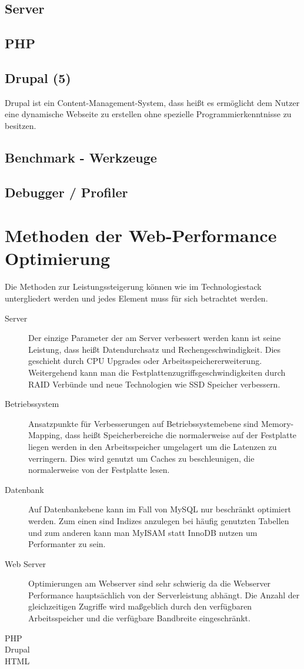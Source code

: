 \subsection{Server}
\subsection{PHP}
\subsection{Drupal (5)}
Drupal ist ein Content-Management-System, dass heißt es ermöglicht dem Nutzer eine dynamische Webseite zu erstellen ohne spezielle Programmierkenntnisse zu besitzen. 
\subsection{Benchmark - Werkzeuge}
\subsection{Debugger / Profiler}
\section{Methoden der Web-Performance Optimierung}
Die Methoden zur Leistungssteigerung können wie im Technologiestack untergliedert werden und jedes Element muss für sich betrachtet werden.

\begin{description}
  \item[Server] Der einzige Parameter der am Server verbessert werden kann ist seine Leistung, dass heißt Datendurchsatz und Rechengeschwindigkeit. Dies geschieht durch CPU Upgrades oder Arbeitsspeichererweiterung. Weitergehend kann man die Festplattenzugriffsgeschwindigkeiten durch RAID Verbünde und neue Technologien wie SSD Speicher verbessern. 
  \item[Betriebssystem] Ansatzpunkte für Verbesserungen auf Betriebssystemebene sind Memory-Mapping, dass heißt Speicherbereiche die normalerweise auf der Festplatte liegen werden in den Arbeitsspeicher umgelagert um die Latenzen zu verringern. Dies wird genutzt um Caches zu beschleunigen, die normalerweise von der Festplatte lesen.
  \item[Datenbank] Auf Datenbankebene kann im Fall von MySQL nur beschränkt optimiert werden. Zum einen sind Indizes anzulegen bei häufig genutzten Tabellen und zum anderen kann man MyISAM statt InnoDB nutzen um Performanter zu sein.
  \item[Web Server] Optimierungen am Webserver sind sehr schwierig da die Webserver Performance hauptsächlich von der Serverleistung abhängt. Die Anzahl der gleichzeitigen Zugriffe wird maßgeblich durch den verfügbaren Arbeitsspeicher und die verfügbare Bandbreite eingeschränkt.
  \item[PHP] 
  \item[Drupal] 
  \item[HTML] 
\end{description}


%
%



